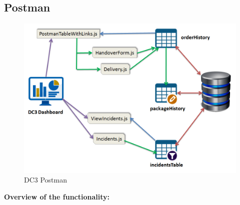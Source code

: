 \subsection{Postman}

\begin{figure}[htp]
    \centering
    \includegraphics[width=4 cm]{images/snet/DC3 Postman.png}
    \caption{DC3 Postman}
    \label{fig:}
\end{figure}

\textbf{Overview of the functionality:}

